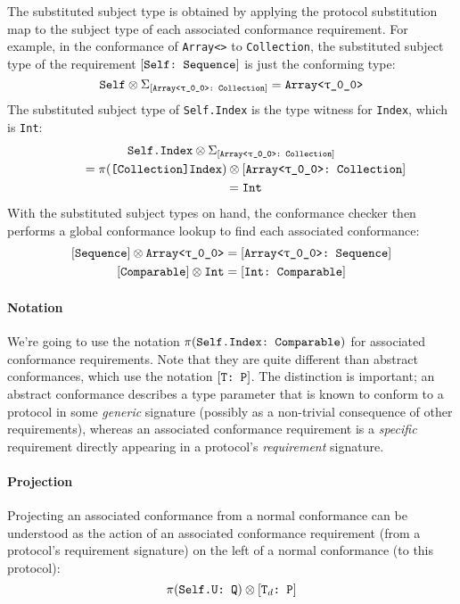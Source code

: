 \documentclass[../generics]{subfiles}
\begin{document}
The substituted subject type is obtained by applying the protocol substitution map to the subject type of each associated conformance requirement. For example, in the conformance of \texttt{Array<>} to \texttt{Collection}, the substituted subject type of the requirement $[\texttt{Self:~Sequence}]$ is just the conforming type:
\[
\texttt{Self} \otimes \Sigma_{[\texttt{Array<\texttt{$\uptau$\_0\_0}>:~Collection}]} = \texttt{Array<\texttt{$\uptau$\_0\_0}>}
\]
The substituted subject type of \verb|Self.Index| is the type witness for \verb|Index|, which is \verb|Int|:
\begin{gather*}
\texttt{Self.Index} \otimes \Sigma_{[\texttt{Array<\texttt{$\uptau$\_0\_0}>:~Collection}]}\\
\qquad {} = \pi(\texttt{[Collection]Index}) \otimes [\texttt{Array<\texttt{$\uptau$\_0\_0}>:~Collection}]\\
\qquad {} = \texttt{Int}
\end{gather*}
With the substituted subject types on hand, the conformance checker then performs a global conformance lookup to find each associated conformance:
\begin{gather*}
\protosym{Sequence} \otimes \texttt{Array<\ttgp{0}{0}>} = \ConfReq{Array<\ttgp{0}{0}>}{Sequence}\\
\protosym{Comparable} \otimes \texttt{Int} = \ConfReq{Int}{Comparable}
\end{gather*}
\paragraph{Notation} We're going to use the notation $\pi(\texttt{Self.Index:~Comparable})$ for associated conformance requirements. Note that they are quite different than abstract conformances, which use the notation $[\texttt{T:~P}]$. The distinction is important; an abstract conformance describes a type parameter that is known to conform to a protocol in some \emph{generic} signature (possibly as a non-trivial consequence of other requirements), whereas an associated conformance requirement is a \emph{specific} requirement directly appearing in a protocol's \emph{requirement} signature.

\paragraph{Projection}
Projecting an associated conformance from a normal conformance can be understood as the action of an associated conformance requirement (from a protocol's requirement signature) on the left of a normal conformance (to this protocol):
\[\pi(\texttt{Self.U:~Q}) \otimes [\texttt{$\texttt{T}_d$:~P}]\]
\end{document}
